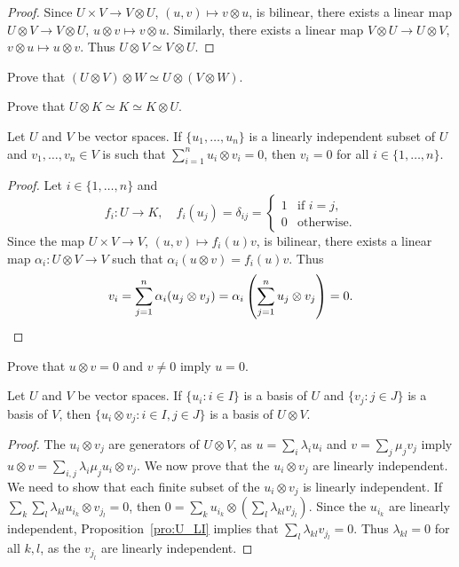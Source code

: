 \begin{proof}
	Since $U\times V\to V\otimes U$, $(u,v)\mapsto v\otimes u$, is bilinear, there exists 
	a linear map $U\otimes V\to V\otimes U$, $u\otimes
	v\mapsto v\otimes u$. Similarly, there exists a linear map 
	$V\otimes U\to U\otimes V$, $v\otimes u\mapsto
	u\otimes v$. Thus $U\otimes V\simeq V\otimes U$.
\end{proof}

\begin{exercise}
	\label{xca:UxVxW}
    Prove that $(U\otimes V)\otimes W\simeq U\otimes(V\otimes W)$.
\end{exercise}

\begin{exercise}
	\label{xca:UxK}
	Prove that $U\otimes K\simeq K\simeq K\otimes U$.
\end{exercise}

\begin{proposition}
	\label{pro:U_LI}
	Let $U$ and $V$ be vector spaces. 
	If $\{u_1,\dots,u_n\}$ is a linearly independent subset of $U$ and 
	$v_1,\dots,v_n\in V$ is such that $\sum_{i=1}^n u_i\otimes v_i=0$, then 
    $v_i=0$ for all $i\in\{1,\dots,n\}$.
\end{proposition}

\begin{proof}
	Let $i\in\{1,\dots,n\}$ and 
	\[
	f_i\colon U\to K,
	\quad
	f_i(u_j)=\delta_{ij}=\begin{cases}
	1 & \text{if $i=j$},\\
	0 & \text{otherwise}.
	\end{cases}
	\]
	Since the map $U\times V\to V$, $(u,v)\mapsto f_i(u)v$, is bilinear, there exists 
	a linear map 
	$\alpha_i\colon U\otimes V\to V$ such that $\alpha_i(u\otimes
	v)=f_i(u)v$. Thus
	\[
		v_i=\sum_{j=1}^n\alpha_i(u_j\otimes v_j)=\alpha_i\left(\sum_{j=1}^nu_j\otimes v_j\right)=0.\qedhere
	\]
\end{proof}

\begin{exercise}
	\label{xca:uxv=0}
	Prove that $u\otimes v=0$ and $v\ne 0$ imply $u=0$.
\end{exercise}

\begin{theorem}
    Let $U$ and $V$ be vector spaces. 
	If $\{u_i:i\in I\}$ is a basis of $U$ and $\{v_j:j\in J\}$ is a basis of $V$, then 
	$\{u_i\otimes v_j:i\in I,j\in J\}$ is a basis of $U\otimes
	V$.
\end{theorem}

\begin{proof}
	The $u_i\otimes v_j$ are generators of $U\otimes V$, as  
    $u=\sum_i\lambda_iu_i$ and $v=\sum_j\mu_jv_j$ imply 
	$u\otimes v=\sum_{i,j}\lambda_i\mu_ju_i\otimes v_j$. 
	We now prove that the $u_i\otimes v_j$ are linearly independent. We need to show that
	each finite subset of the $u_i\otimes v_j$
	is linearly independent. If $\sum_k\sum_l\lambda_{kl}u_{i_k}\otimes
	v_{j_l}=0$, then 
	$0=\sum_{k}u_{i_k}\otimes\left(\sum_{l}\lambda_{kl}v_{j_l}\right)$. Since  
	the $u_{i_k}$ are linearly independent, Proposition~\ref{pro:U_LI}
	implies that $\sum_{l}\lambda_{kl}v_{j_l}=0$. Thus $\lambda_{kl}=0$ for all 
	$k,l$, as the $v_{j_l}$ are linearly independent. 
\end{proof}

